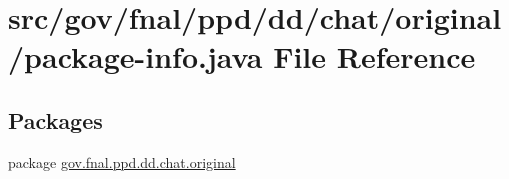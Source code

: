 \hypertarget{gov_2fnal_2ppd_2dd_2chat_2original_2package-info_8java}{\section{src/gov/fnal/ppd/dd/chat/original/package-\/info.java File Reference}
\label{gov_2fnal_2ppd_2dd_2chat_2original_2package-info_8java}
}
\subsection*{Packages}
\begin{DoxyCompactItemize}
\item 
package \hyperlink{namespacegov_1_1fnal_1_1ppd_1_1dd_1_1chat_1_1original}{gov.\-fnal.\-ppd.\-dd.\-chat.\-original}
\end{DoxyCompactItemize}
